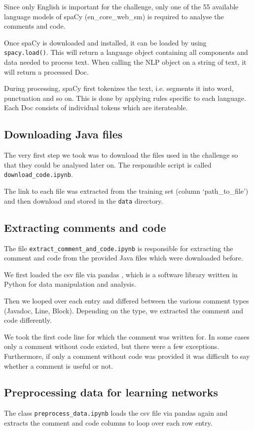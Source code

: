 \documentclass[runningheads]{llncs}
\begin{document}
Since only English is important for the challenge, only one of the 55 available language models of spaCy (en\_core\_web\_sm) is required to analyse the comments and code.

Once spaCy is downloaded and installed, it can be loaded by using \texttt{spacy.load()}. This will return a language object containing all components and data needed to process text.
When calling the NLP object on a string of text, it will return a processed Doc.

During processing, spaCy first tokenizes the text, i.e. segments it into word, punctuation and so on. This is done by applying rules specific to each language. Each Doc consists of individual tokens which are iterateable.

\subsection{Downloading Java files}
The very first step we took was to download the files used in the challenge so that they could be analysed later on. The responsible script is called \texttt{download\_code.ipynb}.

The link to each file was extracted from the training set (column `path\_to\_file') and then download and stored in the \texttt{data} directory.

\subsection{Extracting comments and code}
The file \texttt{extract\_comment\_and\_code.ipynb} is responsible for extracting the comment and code from the provided Java files which were downloaded before.

We first loaded the csv file via pandas \cite{ref_pandas}, which is a software library written in Python for data manipulation and analysis.

Then we looped over each entry and differed between the various comment types (Javadoc, Line, Block). Depending on the type, we extracted the comment and code differently.

We took the first code line for which the comment was written for. In some cases only a comment without code existed, but there were a few exceptions. Furthermore, if only a comment without code was provided it was difficult to say whether a comment is useful or not.

\subsection{Preprocessing data for learning networks}
The class \texttt{preprocess\_data.ipynb} loads the csv file via pandas again and extracts the comment and code columns to loop over each row entry.
\end{document}
